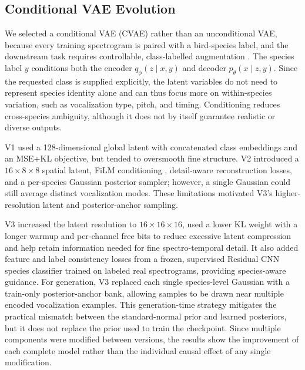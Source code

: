 \documentclass{article}
\begin{document}
\subsection{Conditional VAE Evolution}

We selected a conditional VAE (CVAE) rather than an unconditional VAE, because 
every training spectrogram is paired with a bird-species label, and the
downstream task requires controllable, class-labelled augmentation
\cite{kingma2014aevb,sohn2015cvae}. The species label $y$ conditions both the
encoder $q_\phi(z\mid x,y)$ and decoder $p_\theta(x\mid z,y)$. Since the
requested class is supplied explicitly, the latent variables do not need to
represent species identity alone and can thus focus more on within-species variation,
such as vocalization type, pitch, and timing. Conditioning reduces
cross-species ambiguity, although it does not by itself guarantee realistic or
diverse outputs.

V1 used a 128-dimensional global latent with concatenated class embeddings and
an MSE+KL objective, but tended to oversmooth fine structure. V2 introduced a
$16\times8\times8$ spatial latent, FiLM conditioning \cite{perez2018film},
detail-aware reconstruction losses, and a per-species Gaussian posterior
sampler; however, a single Gaussian could still average distinct vocalization
modes. These limitations motivated V3's higher-resolution latent and
posterior-anchor sampling.

V3 increased the latent resolution to $16\times16\times16$, used a lower KL
weight with a longer warmup and per-channel free bits to reduce excessive
latent compression and help retain information needed for fine
spectro-temporal detail. It also added feature and label consistency losses
from a frozen, supervised Residual CNN species classifier trained on labeled
real spectrograms, providing species-aware guidance. For generation, V3 replaced each
single species-level Gaussian with a train-only posterior-anchor bank, allowing
samples to be drawn near multiple encoded vocalization examples. This
generation-time strategy mitigates the practical mismatch between the
standard-normal prior and learned posteriors, but it does not replace the prior
used to train the checkpoint. Since multiple components were modified between versions, 
the results show the improvement of each complete model rather than the individual causal
effect of any single modification.
\end{document}
